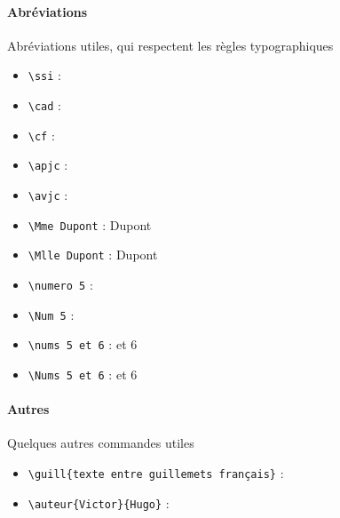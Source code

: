 \paragraph{Abréviations} Abréviations utiles, qui respectent les règles typographiques
\begin{itemize}
    \item \verb=\ssi= : \ssi
    \item \verb=\cad= : \cad
    \item \verb=\cf= : \cf
    \item \verb=\apjc= : \apjc
    \item \verb=\avjc= : \avjc
    \item \verb=\Mme Dupont= : \Mme Dupont
    \item \verb=\Mlle Dupont= : \Mlle Dupont
    \item \verb=\numero 5= : 
    \item \verb=\Num 5= : 
    \item \verb=\nums 5 et 6= :  et 6
    \item \verb=\Nums 5 et 6= :  et 6
\end{itemize}

\paragraph{Autres} Quelques autres commandes utiles
\begin{itemize}
    \item \verb=\guill{texte entre guillemets français}= : 
    \item \verb=\auteur{Victor}{Hugo}= : 
\end{itemize}





